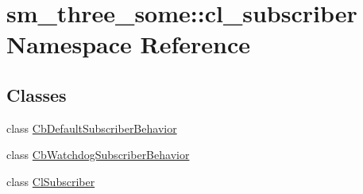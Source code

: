 \hypertarget{namespacesm__three__some_1_1cl__subscriber}{}\section{sm\+\_\+three\+\_\+some\+:\+:cl\+\_\+subscriber Namespace Reference}
\label{namespacesm__three__some_1_1cl__subscriber}
\subsection*{Classes}
\begin{DoxyCompactItemize}
\item 
class \hyperlink{classsm__three__some_1_1cl__subscriber_1_1CbDefaultSubscriberBehavior}{Cb\+Default\+Subscriber\+Behavior}
\item 
class \hyperlink{classsm__three__some_1_1cl__subscriber_1_1CbWatchdogSubscriberBehavior}{Cb\+Watchdog\+Subscriber\+Behavior}
\item 
class \hyperlink{classsm__three__some_1_1cl__subscriber_1_1ClSubscriber}{Cl\+Subscriber}
\end{DoxyCompactItemize}
